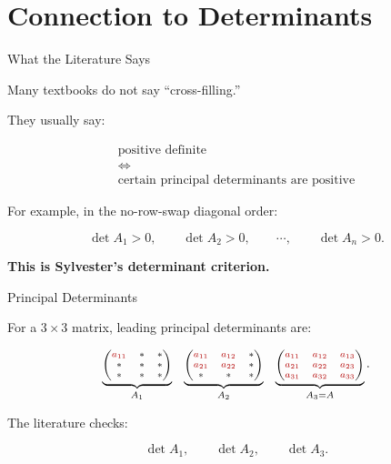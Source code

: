 \documentclass[10pt]{beamer}
\theoremstyle{definition}
\newcommand{\x}[1]{\alert{\textbf{#1}}}
\newcommand{\rd}[1]{{\color{red!70!black}#1}}
\begin{document}
\section{Connection to Determinants}

\begin{frame}{What the Literature Says}

Many textbooks do not say ``cross-filling.''

\vfill

They usually say:

\[
\boxed{
\begin{array}{c}
\text{positive definite}\\
\Longleftrightarrow\\
\text{certain principal determinants are positive}
\end{array}}
\]

\vfill

For example, in the no-row-swap diagonal order:

$$
\det A_1>0,\qquad \det A_2>0,\qquad \cdots,\qquad \det A_n>0.
$$

\vfill

\begin{center}
\x{This is Sylvester's determinant criterion.}
\end{center}

\end{frame}


\begin{frame}{Principal Determinants}

For a $3\times3$ matrix, leading principal determinants are:

\[
\scriptsize
\underbrace{
\begin{pmatrix}
\rd{a_{11}}&*&*\\
*&*&*\\
*&*&*
\end{pmatrix}}_{A_1}
\quad
\underbrace{
\begin{pmatrix}
\rd{a_{11}}&\rd{a_{12}}&*\\
\rd{a_{21}}&\rd{a_{22}}&*\\
*&*&*
\end{pmatrix}}_{A_2}
\quad
\underbrace{
\begin{pmatrix}
\rd{a_{11}}&\rd{a_{12}}&\rd{a_{13}}\\
\rd{a_{21}}&\rd{a_{22}}&\rd{a_{23}}\\
\rd{a_{31}}&\rd{a_{32}}&\rd{a_{33}}
\end{pmatrix}}_{A_3=A}.
\]

\vfill

The literature checks:

$$
\det A_1,\qquad \det A_2,\qquad \det A_3.
$$

\end{frame}
\end{document}
